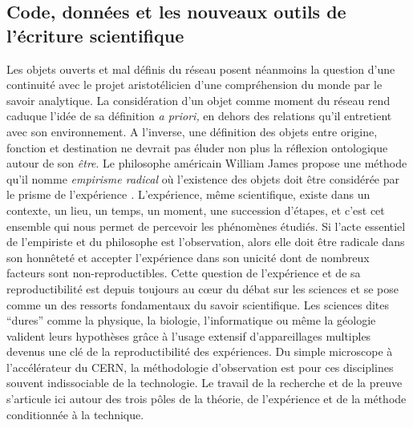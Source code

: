 \subsection[Code, données et les nouveaux outils de l{\textquoteright}écriture scientifique ]{Code, données et les nouveaux outils de l{\textquoteright}écriture scientifique }
Les objets ouverts et mal définis du réseau posent néanmoins la question d{\textquoteright}une continuité avec le projet aristotélicien d{\textquoteright}une compréhension du monde par le savoir analytique. La considération d{\textquoteright}un objet comme moment du réseau rend caduque l{\textquoteright}idée de sa définition \textit{a priori, }en dehors des relations qu{\textquoteright}il entretient avec son environnement. A l{\textquoteright}inverse, une définition des objets entre origine, fonction et destination ne devrait pas éluder non plus la réflexion ontologique autour de son \textit{\^etre}. Le philosophe américain William James propose une méthode qu{\textquoteright}il nomme \textit{empirisme radical }o\`u l{\textquoteright}existence des objets doit \^etre considérée par le prisme de l{\textquoteright}expérience \citep{James1912}\textit{. }L{\textquoteright}expérience, m\^eme scientifique, existe dans un contexte, un lieu, un temps, un moment, une succession d{\textquoteright}étapes, et c{\textquoteright}est cet ensemble qui nous permet de percevoir les phénomènes étudiés. Si l{\textquoteright}acte essentiel de l{\textquoteright}empiriste et du philosophe est l{\textquoteright}observation, alors elle doit \^etre radicale dans son honn\^eteté et accepter l{\textquoteright}expérience dans son unicité dont de nombreux facteurs sont non-reproductibles. Cette question de l{\textquoteright}expérience et de sa reproductibilité est depuis toujours au c{\oe}ur du débat sur les sciences et se pose comme un des ressorts fondamentaux du savoir scientifique. Les sciences dites {\textquotedblleft}dures{\textquotedblright} comme la physique, la biologie, l{\textquoteright}informatique ou m\^eme la géologie valident leurs hypothèses gr\^ace à l{\textquoteright}usage extensif d{\textquoteright}appareillages multiples devenus une clé de la reproductibilité des expériences. Du simple microscope à l{\textquoteright}accélérateur du CERN, la méthodologie d{\textquoteright}observation est pour ces disciplines souvent indissociable de la technologie. Le travail de la recherche et de la preuve s{\textquoteright}articule ici autour des trois p\^oles de la théorie, de l{\textquoteright}expérience et de la méthode conditionnée à la technique.  

